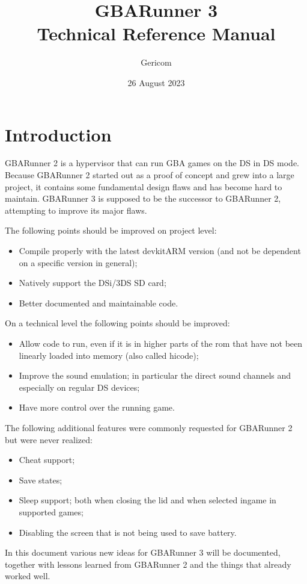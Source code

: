 \documentclass[a4paper,10pt]{report}
\title{GBARunner 3\\Technical Reference Manual}
\author{Gericom}
\date{26 August 2023}
\begin{document}
\maketitle
\tableofcontents
\chapter{Introduction}
	GBARunner 2 is a hypervisor that can run GBA games on the DS in DS mode. Because GBARunner 2 started out as a proof of concept and grew into a large project, it contains some fundamental design flaws and has become hard to maintain. GBARunner 3 is supposed to be the successor to GBARunner 2, attempting to improve its major flaws.
	
	The following points should be improved on project level:
	\begin{itemize}
		\item Compile properly with the latest devkitARM version (and not be dependent on a specific version in general);
		\item Natively support the DSi/3DS SD card;
		\item Better documented and maintainable code.
	\end{itemize}

	On a technical level the following points should be improved:
	\begin{itemize}
		\item Allow code to run, even if it is in higher parts of the rom that have not been linearly loaded into memory (also called hicode);
		\item Improve the sound emulation; in particular the direct sound channels and especially on regular DS devices;
		\item Have more control over the running game.
	\end{itemize}

	The following additional features were commonly requested for GBARunner 2 but were never realized:
	\begin{itemize}
		\item Cheat support;
		\item Save states;
		\item Sleep support; both when closing the lid and when selected ingame in supported games;
		\item Disabling the screen that is not being used to save battery.
	\end{itemize}

	In this document various new ideas for GBARunner 3 will be documented, together with lessons learned from GBARunner 2 and the things that already worked well.
\end{document}
